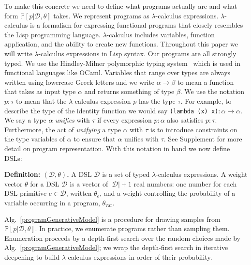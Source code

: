 \documentclass{article}
\newcommand{\code}[1]{{\footnotesize\texttt{#1}}}
\newcommand{\probability}{\mathds{P}} %
\begin{document}
To make this concrete we need to define what programs actually are and
what form $\probability[p |\mathcal{D},\theta]$ takes.
We represent programs as $\lambda$-calculus expressions.
$\lambda$-calculus is a formalism for expressing functional programs
that closely resembles the Lisp programming language.
$\lambda$-calculus includes variables, function application, and the ability to create new functions.
Throughout this paper we will write $\lambda$-calculus expressions in Lisp syntax.
Our programs are all strongly typed.
We use the Hindley-Milner polymorphic typing system~\cite{pierce} which is used in functional languages like OCaml.
Variables that range over types are always written using lowercase Greek letters
and we write $\alpha\to \beta$ to mean a function that takes as input type $\alpha$
and returns something of type $\beta$.
We use the notation $p:\tau$ to mean that the $\lambda$-calculus expression $p$
has the type $\tau$.
For example, to describe the type of the identity function
we would say \code{(lambda (x) x)}$:\alpha\to \alpha$.
We say a type $\alpha$ \emph{unifies} with $\tau$ if every expression
$p:\alpha$ also satisfies $p:\tau$. Furthermore, the act of \emph{unifying}
a type $\alpha$ with $\tau$ is to introduce constraints on the type
variables of $\alpha$ to ensure that $\alpha$ unifies with $\tau$.
See Supplement for more detail on program representation.
With this notation in hand we now define DSLs:

\noindent\textbf{Definition: $(\mathcal{D},\theta)$.}
A DSL $\mathcal{D}$ is a set of typed $\lambda$-calculus expressions.
A weight vector $\theta$ for a DSL $\mathcal{D}$ is a vector of $|\mathcal{D}| + 1$ real numbers:
one number for each DSL primitive $e\in \mathcal{D}$, written $\theta_e$,
and a weight controlling the probability of a variable occurring in a program, $\theta_{\text{var}}$.

Alg.~\ref{programGenerativeModel} is a procedure for drawing
samples from $\probability[p|\mathcal{D},\theta]$.  In practice, we
enumerate programs rather than sampling them.  Enumeration proceeds by
a depth-first search over the random choices made by
Alg.~\ref{programGenerativeModel}; we wrap the depth-first search
in iterative deepening to build $\lambda$-calculus
expressions in order of their probability.
\end{document}
